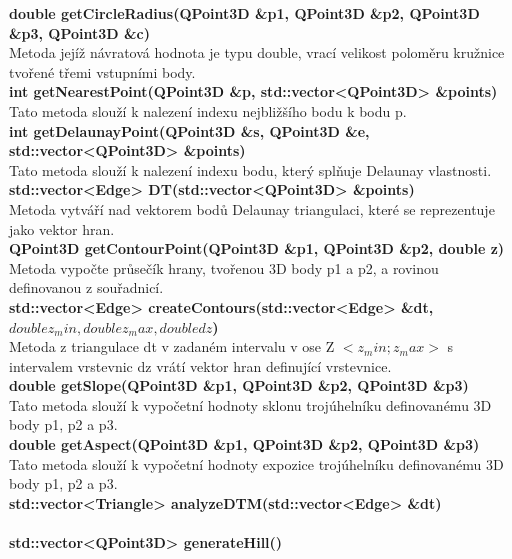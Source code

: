\documentclass[a4paper, 12pt]{article}
\begin{document}
\textbf{double getCircleRadius(QPoint3D \&p1, QPoint3D \&p2, QPoint3D \&p3, QPoint3D \&c)}\\
Metoda jejíž návratová hodnota je typu double, vrací velikost poloměru kružnice tvořené třemi vstupními body.\\

\textbf{int getNearestPoint(QPoint3D \&p, std::vector<QPoint3D> \&points)}\\
Tato metoda slouží k nalezení indexu nejbližšího bodu k bodu p.\\

\textbf{int getDelaunayPoint(QPoint3D \&s, QPoint3D \&e, std::vector<QPoint3D> \&points)}\\
Tato metoda slouží k nalezení indexu bodu, který splňuje Delaunay vlastnosti.\\

\textbf{std::vector<Edge> DT(std::vector<QPoint3D> \&points)}\\
Metoda vytváří nad vektorem bodů Delaunay triangulaci, které se reprezentuje jako vektor hran.\\

\textbf{QPoint3D getContourPoint(QPoint3D \&p1, QPoint3D \&p2, double z)}\\
Metoda vypočte průsečík hrany, tvořenou 3D body p1 a p2, a rovinou definovanou z souřadnicí.\\

\textbf{std::vector<Edge> createContours(std::vector<Edge> \&dt, $double z_min, double z_max, double dz$)}\\
Metoda z triangulace dt v zadaném intervalu v ose Z $<z_min ; z_max>$ s intervalem vrstevnic dz vrátí vektor hran definující vrstevnice.\\

\textbf{double getSlope(QPoint3D \&p1, QPoint3D \&p2, QPoint3D \&p3)}\\
Tato metoda slouží k vypočetní hodnoty sklonu trojúhelníku definovanému 3D body p1, p2 a p3.\\

\textbf{double getAspect(QPoint3D \&p1, QPoint3D \&p2, QPoint3D \&p3)}\\
Tato metoda slouží k vypočetní hodnoty expozice trojúhelníku definovanému 3D body p1, p2 a p3.\\

\textbf{std::vector<Triangle> analyzeDTM(std::vector<Edge> \&dt)}\\
\\

\textbf{std::vector<QPoint3D> generateHill()}\\
\\
\end{document}
